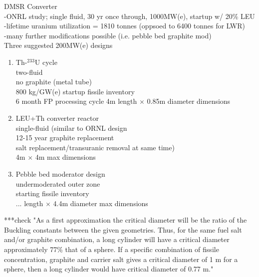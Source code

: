 \documentclass{report}
\begin{document}
DMSR Converter\\
-ONRL study; single fluid, 30 yr once through, 1000MW(e), startup w/ 20\% LEU\\
-lifetime uranium utilization = 1810 tonnes (oppsoed to 6400 tonnes for LWR)\\
-many further modifications possible (i.e. pebble bed graphite mod)\\

Three suggested 200MW(e) designs\\
\begin{enumerate}
    \item Th-$^{233}\text{U}$ cycle\\
            two-fluid\\
            no graphite (metal tube)\\
            800 kg/GW(e) startup fissile inventory\\
            6 month FP processing cycle
            4m length $\times$ 0.85m diameter dimensions
    \item LEU+Th converter reactor\\
            single-fluid (similar to ORNL design\\
            12-15 year graphite replacement\\
            salt replacement/transuranic removal at same time)\\
            4m $\times$ 4m max dimensions\\
    \item Pebble bed moderator design\\
            undermoderated outer zone\\
            starting fissile inventory\\
            ... length $\times$ 4.4m diameter max dimensions
\end{enumerate}

***check "As a first approximation the critical diameter will be the ratio of the Buckling constants between the given geometries. Thus, for the same fuel salt and/or graphite combination, a long cylinder will have a critical diameter approximately 77\% that of a sphere. If a specific combination of fissile concentration, graphite and carrier salt gives a critical diameter of 1 m for a sphere, then a long cylinder would have critical diameter of 0.77 m."
\end{document}
